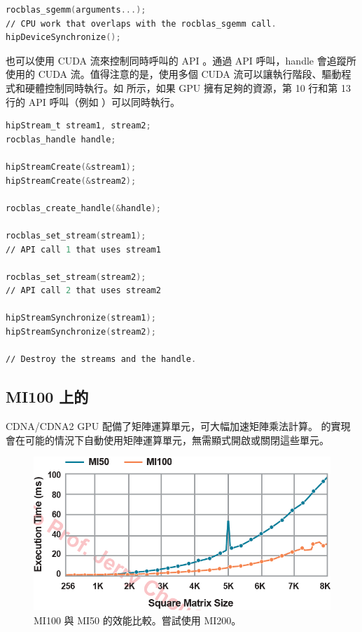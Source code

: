 \begin{lstlisting}[language=C, caption={\term{rocBLAS} 與 CPU 同時執行。}, captionpos=t, label={lst:overlap}]
rocblas_sgemm(arguments...);
∕∕ CPU work that overlaps with the rocblas_sgemm call.
hipDeviceSynchronize();
\end{lstlisting}

也可以使用 CUDA 流來控制同時呼叫的 API 。通過  API 呼叫，handle 會追蹤所使用的 CUDA 流。值得注意的是，使用多個 CUDA 流可以讓執行階段、驅動程式和硬體控制同時執行。如  所示，如果 GPU 擁有足夠的資源，第 10 行和第 13 行的 API 呼叫（例如 ）可以同時執行。

\begin{lstlisting}[language=C, caption={多 device 與多 CUDA 流的 \term{rocBLAS} 執行}, captionpos=t, label={lst:stream}]
hipStream_t stream1, stream2;
rocblas_handle handle;

hipStreamCreate(&stream1);
hipStreamCreate(&stream2);

rocblas_create_handle(&handle);

rocblas_set_stream(stream1);
∕∕ API call 1 that uses stream1

rocblas_set_stream(stream2);
∕∕ API call 2 that uses stream2

hipStreamSynchronize(stream1);
hipStreamSynchronize(stream2);

∕∕ Destroy the streams and the handle.
\end{lstlisting}

\subsection{MI100 上的 }
CDNA/CDNA2 GPU 配備了矩陣運算單元，可大幅加速矩陣乘法計算。 的實現會在可能的情況下自動使用矩陣運算單元，無需顯式開啟或關閉這些單元。

\begin{figure}
    \centering
    \includegraphics[width=0.9\linewidth]{FileAusiliari/Screenshots/Figure9-1.png}
    \caption{MI100 與 MI50 的效能比較。嘗試使用 MI200。}
    \label{fig:MI100}
\end{figure}

